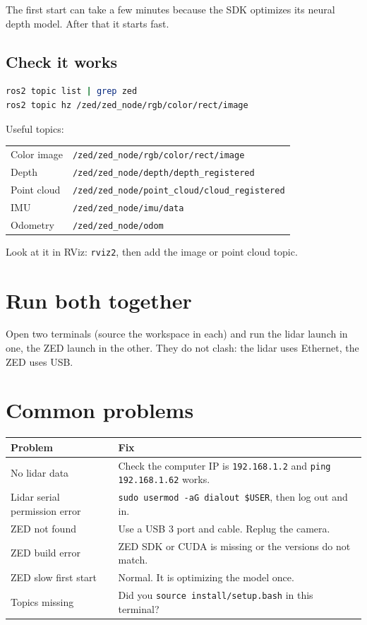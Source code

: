 \documentclass[11pt,a4paper]{article}
\begin{document}
The first start can take a few minutes because the SDK optimizes its neural depth model. After that it starts fast.

\subsection{Check it works}

\begin{lstlisting}[language=bash]
ros2 topic list | grep zed
ros2 topic hz /zed/zed_node/rgb/color/rect/image
\end{lstlisting}

Useful topics:

\begin{tabular}{ll}
  Color image & \texttt{/zed/zed\_node/rgb/color/rect/image} \\
  Depth       & \texttt{/zed/zed\_node/depth/depth\_registered} \\
  Point cloud & \texttt{/zed/zed\_node/point\_cloud/cloud\_registered} \\
  IMU         & \texttt{/zed/zed\_node/imu/data} \\
  Odometry    & \texttt{/zed/zed\_node/odom} \\
\end{tabular}

Look at it in RViz: \texttt{rviz2}, then add the image or point cloud topic.

\section{Run both together}

Open two terminals (source the workspace in each) and run the lidar launch in one, the ZED launch in the other. They do not clash: the lidar uses Ethernet, the ZED uses USB.

\section{Common problems}

\begin{tabular}{p{5cm}p{9cm}}
  \textbf{Problem} & \textbf{Fix} \\ \hline
  No lidar data & Check the computer IP is \texttt{192.168.1.2} and \texttt{ping 192.168.1.62} works. \\
  Lidar serial permission error & \texttt{sudo usermod -aG dialout \$USER}, then log out and in. \\
  ZED not found & Use a USB 3 port and cable. Replug the camera. \\
  ZED build error & ZED SDK or CUDA is missing or the versions do not match. \\
  ZED slow first start & Normal. It is optimizing the model once. \\
  Topics missing & Did you \texttt{source install/setup.bash} in this terminal? \\
\end{tabular}
\end{document}
